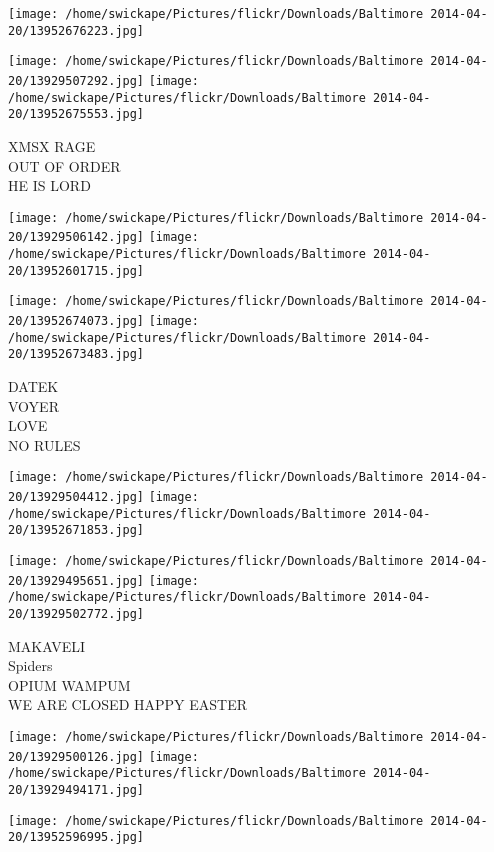 \documentclass[10pt,letterpaper]{article}
\begin{document}
\texttt{[image: /home/swickape/Pictures/flickr/Downloads/Baltimore 2014-04-20/13952676223.jpg]}

\vspace{0.25in}
\texttt{[image: /home/swickape/Pictures/flickr/Downloads/Baltimore 2014-04-20/13929507292.jpg]}
\texttt{[image: /home/swickape/Pictures/flickr/Downloads/Baltimore 2014-04-20/13952675553.jpg]}

XMSX RAGE\\
OUT OF ORDER\\
HE IS LORD\\
\pagebreak

\texttt{[image: /home/swickape/Pictures/flickr/Downloads/Baltimore 2014-04-20/13929506142.jpg]}
\texttt{[image: /home/swickape/Pictures/flickr/Downloads/Baltimore 2014-04-20/13952601715.jpg]}

\texttt{[image: /home/swickape/Pictures/flickr/Downloads/Baltimore 2014-04-20/13952674073.jpg]}
\texttt{[image: /home/swickape/Pictures/flickr/Downloads/Baltimore 2014-04-20/13952673483.jpg]}

DATEK\\
VOYER\\
LOVE\\
NO RULES\\
\pagebreak

\texttt{[image: /home/swickape/Pictures/flickr/Downloads/Baltimore 2014-04-20/13929504412.jpg]}
\texttt{[image: /home/swickape/Pictures/flickr/Downloads/Baltimore 2014-04-20/13952671853.jpg]}

\texttt{[image: /home/swickape/Pictures/flickr/Downloads/Baltimore 2014-04-20/13929495651.jpg]}
\texttt{[image: /home/swickape/Pictures/flickr/Downloads/Baltimore 2014-04-20/13929502772.jpg]}

MAKAVELI\\
Spiders\\
OPIUM WAMPUM\\
WE ARE CLOSED HAPPY EASTER\\
\pagebreak

\texttt{[image: /home/swickape/Pictures/flickr/Downloads/Baltimore 2014-04-20/13929500126.jpg]}
\texttt{[image: /home/swickape/Pictures/flickr/Downloads/Baltimore 2014-04-20/13929494171.jpg]}

\vspace{0.25in}
\texttt{[image: /home/swickape/Pictures/flickr/Downloads/Baltimore 2014-04-20/13952596995.jpg]}
\end{document}
